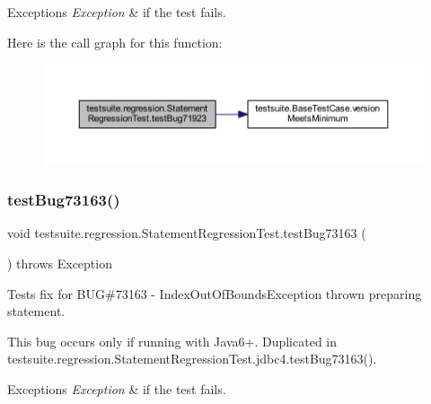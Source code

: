 \begin{DoxyExceptions}{Exceptions}
{\em Exception} & if the test fails. \\
\hline
\end{DoxyExceptions}
Here is the call graph for this function\+:
\nopagebreak
\begin{figure}[H]
\begin{center}
\leavevmode
\includegraphics[width=350pt]{classtestsuite_1_1regression_1_1_statement_regression_test_a3676f906ace9714006ad7a71ab1e4211_cgraph}
\end{center}
\end{figure}
\mbox{\label{classtestsuite_1_1regression_1_1_statement_regression_test_ae5f07756a16c505fbd7fb497fcf9f601}} 
\subsubsection{\texorpdfstring{test\+Bug73163()}{testBug73163()}}
{\footnotesize\ttfamily void testsuite.\+regression.\+Statement\+Regression\+Test.\+test\+Bug73163 (\begin{DoxyParamCaption}{ }\end{DoxyParamCaption}) throws Exception}

Tests fix for B\+UG\#73163 -\/ Index\+Out\+Of\+Bounds\+Exception thrown preparing statement.

This bug occurs only if running with Java6+. Duplicated in testsuite.\+regression.\+Statement\+Regression\+Test.\+jdbc4.\+test\+Bug73163().


\begin{DoxyExceptions}{Exceptions}
{\em Exception} & if the test fails. \\
\hline
\end{DoxyExceptions}
\mbox{\label{classtestsuite_1_1regression_1_1_statement_regression_test_a785d6999de84a7868d85817387113884}} 
